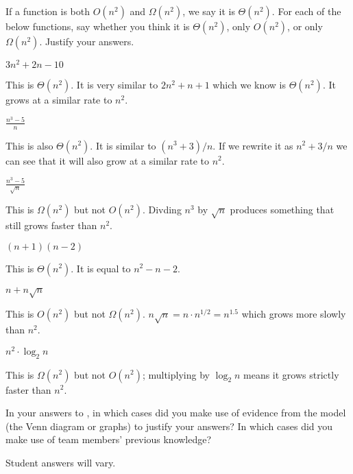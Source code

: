 \documentclass{tufte-handout}
\begin{document}
\begin{questions}
\item \label{q:classify} If a function is both $O(n^2)$ and
  $\Omega(n^2)$, we say it is $\Theta(n^2)$.    For each of the below functions, say
  whether you think it is $\Theta(n^2)$, only $O(n^2)$, or
  only $\Omega(n^2)$.  Justify your answers.
  \begin{subquestions}
  \item $3n^2 + 2n - 10$
    \begin{answer}
      This is $\Theta(n^2)$.  It is very similar to $2n^2 + n + 1$ which
      we know is $\Theta(n^2)$.  It grows at a similar rate to $n^2$.
    \end{answer}
  \item $\displaystyle \frac{n^3 - 5}{n}$
    \begin{answer}
      This is also $\Theta(n^2)$.  It is similar to $(n^3 + 3)/n$.  If
      we rewrite it as $n^2 + 3/n$ we can see that it will also grow
      at a similar rate to $n^2$.
    \end{answer}
  \item $\displaystyle \frac{n^3 - 5}{\sqrt n}$
    \begin{answer}
      This is $\Omega(n^2)$ but not $O(n^2)$.  Divding $n^3$ by $\sqrt
      n$ produces something that still grows faster than $n^2$.
    \end{answer}
  \item $(n+1)(n-2)$
    \begin{answer}
      This is $\Theta(n^2)$. It is equal to $n^2 - n - 2$.
    \end{answer}
  \item $n + n \sqrt n$
    \begin{answer}
      This is $O(n^2)$ but not $\Omega(n^2)$.  $n \sqrt n = n \cdot
      n^{1/2} = n^{1.5}$ which grows more slowly than $n^2$.
    \end{answer}
  \item $n^2 \cdot \log_2 n$
    \begin{answer}
      This is $\Omega(n^2)$ but not $O(n^2)$; multiplying by
      $\log_2 n$ means it grows strictly faster than $n^2$.
    \end{answer}
  \end{subquestions}
\item In your answers to , in which cases did you
  make use of evidence from the model (the Venn diagram or graphs) to
  justify your answers?  In which cases did you make use of team
  members' previous knowledge?
  \begin{answer}
    Student answers will vary.
  \end{answer}
\end{questions}
\end{document}
